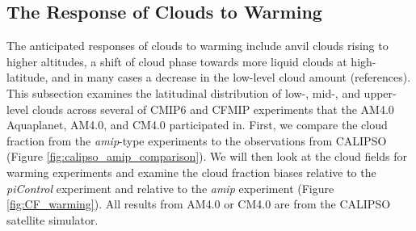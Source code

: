 \documentclass[draft]{agujournal2019}
\begin{document}
%
%


\subsection{The Response of Clouds to Warming}

The anticipated responses of clouds to warming include anvil clouds rising to higher altitudes, a 
shift of cloud phase towards more liquid clouds at high-latitude, and in many cases a decrease in the 
low-level cloud amount (references).  This subsection examines the latitudinal distribution of low-, mid-, and upper-level clouds across 
several of CMIP6 and CFMIP experiments that the AM4.0 Aquaplanet, AM4.0, and CM4.0 participated in.  First, we compare the 
cloud fraction from the \textit{amip}-type experiments to the observations from CALIPSO (Figure \ref{fig:calipso_amip_comparison}).   
We will then look at the cloud fields for warming experiments and examine the cloud fraction biases relative to the \textit{piControl} 
experiment and relative to the \textit{amip} experiment (Figure \ref{fig:CF_warming}).   All results from AM4.0 or CM4.0 are from 
the CALIPSO satellite simulator.  
\end{document}
